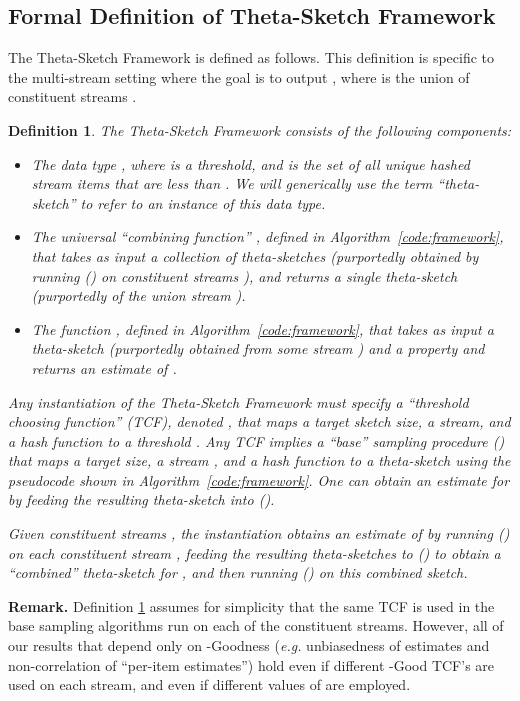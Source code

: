 \documentclass{article}
\newtheorem{definition}[theorem]{Definition}
\begin{document}
\subsection{Formal Definition of Theta-Sketch Framework}
\label{app:framework}
The Theta-Sketch Framework is defined as follows. This definition is specific to the multi-stream setting where the goal is to output , where  is the union of constituent streams .
\begin{definition} \label{def:tsf}
The Theta-Sketch Framework consists of the following components:
 \begin{itemize}
  \item The data type , where  is a 
   threshold, and  is the set of all unique hashed stream items
    that are less than . We will generically use the term ``theta-sketch'' to refer to an instance
   of this data type.
  \item The universal ``combining function'' , defined in Algorithm~\ref{code:framework}, that takes as input a 
  collection of theta-sketches (purportedly obtained by running () on constituent streams ),
  and returns a single theta-sketch (purportedly of the union stream ).
  \item The function , defined in Algorithm~\ref{code:framework},
  that takes as input a theta-sketch  (purportedly obtained from some stream ) and a property 
  and returns an estimate of .
\end{itemize}
  Any instantiation of the Theta-Sketch Framework must specify a ``threshold choosing function'' (TCF), denoted ,
   that maps a target sketch size, a stream, and a hash function  to a threshold . 
   Any TCF  implies a ``base'' sampling procedure () that maps a target size, a stream , and a hash function to a theta-sketch
  using the pseudocode shown in Algorithm~\ref{code:framework}. One can obtain an estimate  for  by feeding the resulting theta-sketch
  into ().
  
  Given constituent streams , the instantiation obtains an estimate  of  by running () 
  on each constituent stream , feeding the resulting theta-sketches to () to obtain a ``combined'' theta-sketch for , and then running
  ()  on this combined sketch. 
\end{definition}

\medskip \noindent \textbf{Remark.}
Definition \ref{def:tsf} assumes for simplicity that the same TCF  is used in the base sampling algorithms run 
on each of the constituent streams. However, all of our results that depend only on -Goodness ({\em e.g.} unbiasedness
of estimates and non-correlation of ``per-item estimates'') hold even if different -Good
TCF's are used on each stream, and even if different values of  are employed.
\end{document}
